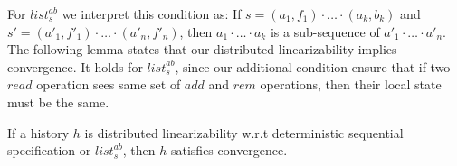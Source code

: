 {For $\mathit{list}_s^{\mathit{ab}}$ we interpret this condition as: If $s = (a_1,f_1) \cdot \ldots \cdot (a_k,b_k)$ and $s' = (a'_1,f'_1) \cdot \ldots \cdot (a'_n,f'_n)$, then $a_1 \cdot \ldots \cdot a_k$ is a sub-sequence of $a'_1 \cdot \ldots \cdot a'_n$. The following lemma states that our distributed linearizability implies convergence. It holds for $\mathit{list}_s^{\mathit{ab}}$, since our additional condition ensure that if two $\mathit{read}$ operation sees same set of $\mathit{add}$ and $\mathit{rem}$ operations, then their local state must be the same.

\begin{lemma}
\label{lemma:distributed linarizability implies convergence}
If a history $h$ is distributed linearizability w.r.t deterministic sequential specification or $\mathit{list}_s^{\mathit{ab}}$, then $h$ satisfies convergence.
\end{lemma}
}

